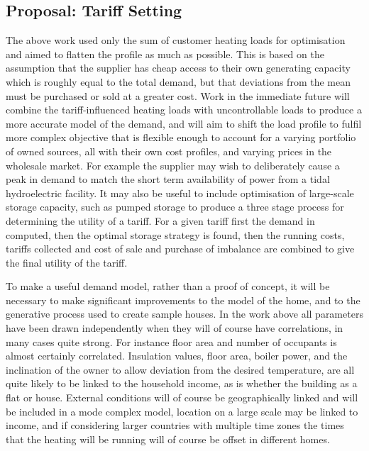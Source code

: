 \documentclass[a4paper, 10 pt, conference]{ieeeconf}  %
\begin{document}
\subsection{Proposal: Tariff Setting}
\label{propmodel}
The above work used only the sum of customer heating loads for optimisation and aimed to flatten the profile as much as possible. This is based on the assumption that the supplier has cheap access to their own generating capacity which is roughly equal to the total demand, but that deviations from the mean must be purchased or sold at a greater cost. Work in the immediate future will combine the tariff-influenced heating loads with uncontrollable loads to produce a more accurate model of the demand, and will aim to shift the load profile to fulfil more complex objective that is flexible enough to account for a varying portfolio of owned sources, all with their own cost profiles, and varying prices in the wholesale market. For example the supplier may wish to deliberately cause a peak in demand to match the short term availability of power from a tidal hydroelectric facility. It may also be useful to include optimisation of large-scale storage capacity, such as pumped storage to produce a three stage process for determining the utility of a tariff. For a given tariff first the demand in computed, then the optimal storage strategy is found, then the running costs, tariffs collected and cost of sale and purchase of imbalance are combined to give the final utility of the tariff.

To make a useful demand model, rather than a proof of concept, it will be necessary to make significant improvements to the model of the home, and to the generative process used to create sample houses. In the work above all parameters have been drawn independently when they will of course have correlations, in many cases quite strong. For instance floor area and number of occupants is almost certainly correlated. Insulation values, floor area, boiler power, and the inclination of the owner to allow deviation from the desired temperature, are all quite likely to be linked to the household income, as is whether the building as a flat or house. External conditions will of course be geographically linked and will be included in a mode complex model, location on a large scale may be linked to income, and if considering larger countries with multiple time zones the times that the heating will be running will of course be offset in different homes.
\end{document}

